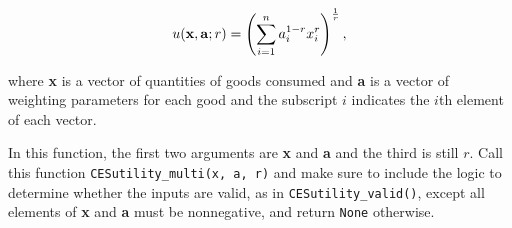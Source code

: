 \documentclass[11pt]{exam}
\begin{document}
\begin{questions}
\begin{parts}
$$u(\text{\textbf{x}}, \text{\textbf{a}}; r) = \left(\sum_{i=1}^{n}a_{i}^{1-r}x_{i}^{r}\right)^{\frac{1}{r}},$$
        
where \textbf{x} is a vector of quantities of goods consumed and \textbf{a} is a vector of weighting parameters for each good and the subscript $i$ indicates the $i$th element of each vector. 

In this function, the first two arguments are \textbf{x} and \textbf{a} and the third is still $r$. Call this function \texttt{CESutility\_multi(x, a, r)} and make sure to include the logic to determine whether the inputs are valid, as in \texttt{CESutility\_valid()}, except all elements of \textbf{x} and \textbf{a} must be nonnegative, and return \texttt{None} otherwise.
        \end{parts}

    \end{questions}
\end{document}
